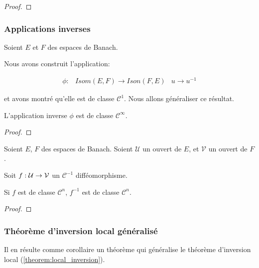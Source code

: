\begin{proof}

\end{proof}

\subsubsection{Applications inverses}

Soient $E$ et $F$ des espaces de Banach.

Nous avons construit l'application:

\begin{align*}
	\phi : & Isom(E, F) \rightarrow Ison(F, E)
	& u \rightarrow u^{-1}
\end{align*}

et avons montré qu'elle est de classe $\mathcal{C}^{1}$. Nous allons généraliser
ce résultat.

\begin{proposition}
	L'application inverse $\phi$ est de classe $\mathcal{C}^{\infty}$.
\end{proposition}

\begin{proof}

\end{proof}

\begin{proposition}
	Soient $E$, $F$ des espaces de Banach.
	Soient $\mathcal{U}$ un ouvert de $E$, et $\mathcal{V}$ un ouvert de $F$.

	Soit $f : \mathcal{U} \rightarrow \mathcal{V}$ un $\mathcal{C}^{-1}$
	difféomorphisme.

	Si $f$ est de classe $\mathcal{C}^{n}$, $f^{-1}$ est de classe
	$\mathcal{C}^{n}$.
\end{proposition}

\begin{proof}

\end{proof}

\subsubsection{Théorème d'inversion local généralisé}

Il en résulte comme corollaire un théorème qui généralise le théorème
d'inversion local (\ref{theorem:local_inversion}).

